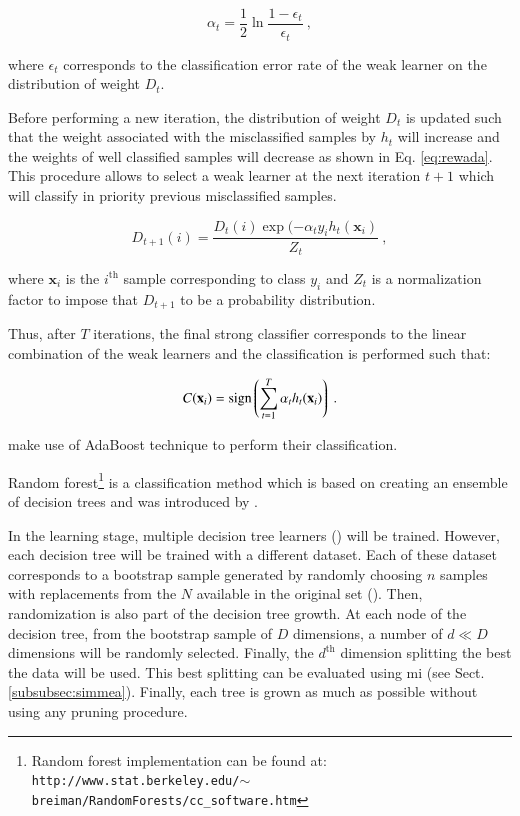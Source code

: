 \begin{enumerate}[leftmargin=*]
\begin{equation}
	\alpha_t = \frac{1}{2} \ln \frac{1 - \epsilon_t}{\epsilon_t} \ ,
	\label{eq:wclssada}
\end{equation}

\noindent where $\epsilon_t$ corresponds to the classification error rate of the weak learner on the distribution of weight $D_t$.

Before performing a new iteration, the distribution of weight $D_t$ is updated such that the weight associated with the misclassified samples by $h_t$ will increase and the weights of well classified samples will decrease as shown in Eq. \eqref{eq:rewada}. This procedure allows to select a weak learner at the next iteration $t+1$ which will classify in priority previous misclassified samples.

\begin{equation}
	D_{t+1}(i) = \frac{ D_t(i) \exp(-\alpha_t y_i h_{t}(\mathbf{x}_{i} ) }{ Z_t  } \ ,
	\label{eq:rewada} 
\end{equation}

\noindent where $\mathbf{x}_i$ is the $i^{\text{th}}$ sample corresponding to class $y_i$ and $Z_t$ is a normalization factor to impose that $D_{t+1}$ to be a probability distribution.

Thus, after $T$ iterations, the final strong classifier corresponds to the linear combination of the weak learners and the classification is performed such that:

\begin{equation}
	C(\mathbf{x}_i) = \operatorname*{sign} \left( \sum_{t=1}^{T} \alpha_t h_t(\mathbf{x}_i) \right) \ .
	\label{eq:strclaada}
\end{equation}

\cite{Lopes2011} make use of AdaBoost technique to perform their classification.

Random forest\footnote{Random forest implementation can be found at: \texttt{http://www.stat.berkeley.edu/\allowbreak $\sim$breiman/RandomForests/cc\_software.htm}} is a classification method which is based on creating an ensemble of decision trees and was introduced by \cite{Breiman2001}.

In the learning stage, multiple decision tree learners (\cite{Breiman1984}) will be trained. However, each decision tree will be trained with a different dataset. Each of these dataset corresponds to a bootstrap sample generated by randomly choosing $n$ samples with replacements from the $N$ available in the original set (\cite{Efron1979}). Then, randomization is also part of the decision tree growth. At each node of the decision tree, from the bootstrap sample of $D$ dimensions, a number of $d \ll D$ dimensions will be randomly selected. Finally, the $d^{\text{th}}$ dimension splitting the best the data will be used. This best splitting can be evaluated using \ac{mi} (see Sect. \ref{subsubsec:simmea}). Finally, each tree is grown as much as possible without using any pruning procedure.


\end{enumerate}
